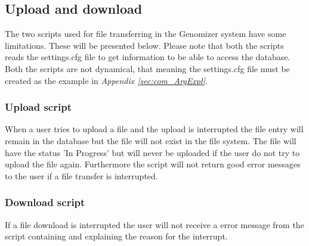 \subsection{Upload and download}
The two scripts used for file transferring in the Genomizer system have some limitations. These will be presented below. Please note that both the scripts reads the settings.cfg file to get information to be able to access the database. Both the scripts are not dynamical, that meaning the settings.cfg file must be created as the example in \emph{Appendix \ref{sec:com_ArgExpl}}.
\subsubsection{Upload script}
When a user tries to upload a file and the upload is interrupted the file entry will remain in the database but the file will not exist in the file system. The file will have the status 'In Progress' but will never be uploaded if the user do not try to upload the file again. Furthermore the script will not return good error messages to the user if a file transfer is interrupted. 
\subsubsection{Download script}
If a file download is interrupted the user will not receive a error message from the script containing and explaining the reason for the interrupt.

